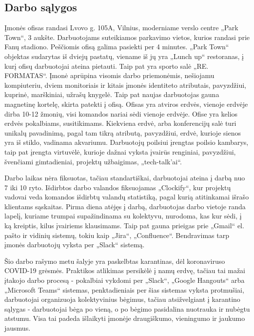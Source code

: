 \subsection{Darbo sąlygos}
Įmonės ofisas randasi Lvovo g. 105A, Vilnius, moderniame verslo centre „Park Town“, 3 aukšte. Darbuotojams suteikiamos parkavimo vietos, kurios randasi prie Fanų stadiono.
Peščiomis ofisą galima pasiekti per 4 minutes. „Park Town“ objektas sudarytas iš dviejų pastatų, viename iš jų yra „Lunch up“ restoranas, į kurį ofisų darbuotojai ateina pietauti.
Taip pat yra sporto salė „RE. FORMATAS“. Įmonė aprūpina visomis darbo priemonėmis, nešiojamu kompiuteriu, dviem monitoriais ir kitais įmonės identiteto atributais, pavyzdžiui,
kuprinė, marškiniai, užrašų knygelė. Taip pat naujas darbuotojas gauna magnetinę kortelę, skirta patekti į ofisą.
Ofisas yra atviros erdvės, vienoje erdvėje dirba 10-12 žmonių, visi komandos nariai sėdi vienoje erdvėje.
Ofise yra kelios erdvės pokalbiams, susitikimams. Kiekviena erdvė, arba konferencijų salė turi unikalų pavadinimą, pagal tam tikrą atributą, pavyzdžiui,
erdvė, kurioje sienos yra iš stiklo, vadinama akvariumu. Darbuotojų poilsiui įrengtas poilsio kambarys, taip pat įrengta virtuvėlė,
kurioje dažnai vyksta įvairūs renginiai, pavyzdžiui, švenčiami gimtadieniai, projektų užbaigimas, „tech-talk'ai“.

Darbo laikas nėra fiksuotas, tačiau standartiškai, darbuotojai ateina į darbą nuo 7 iki 10 ryto. Išdirbtos darbo valandos fiksuojamas „Clockify“, kur projektų vadovai veda
komandos išdirbtų valandų statistiką, pagal kurią atitinkamai išrašo klientams sąskaitas.
Pirma diena atėjęs į darbą, darbuotojas darbo vietoje randa lapelį, kuriame trumpai supažindinama su kolektyvu, nurodoma, kas kur sėdi, į ką kreiptis, kilus įvairiems klausimams.
Taip pat gauna prieigas prie „Gmail“ el. pašto ir vidinių sistemų, tokiu kaip „Jira“, „Confluence“. Bendravimas tarp įmonės darbuotojų vyksta per „Slack“ sistemą.

Šio darbo rašymo metu šalyje yra paskelbtas karantinas, dėl koronaviruso COVID-19 grėsmės. Praktikos atlikimas persikėlė į namų erdvę, tačiau tai mažai įtakojo
darbo procesą - pokalbiai vykdomi per „Slack“, „Google Hangouts“ arba „Microsoft Teams“ sistemas, penktadieniais per šias sistemas vyksta protmušiai, darbuotojai organizuoja
kolektyvinius bėgimus, tačiau atsižvelgiant į karantino sąlygas - darbuotojai bėga po vieną, o po bėgimo pasidalina nuotrauka ir nubėgtu atstumu. Visa tai padeda išlaikyti
įmonėje draugiškumo, vieningumo ir jaukumo jausmus.
